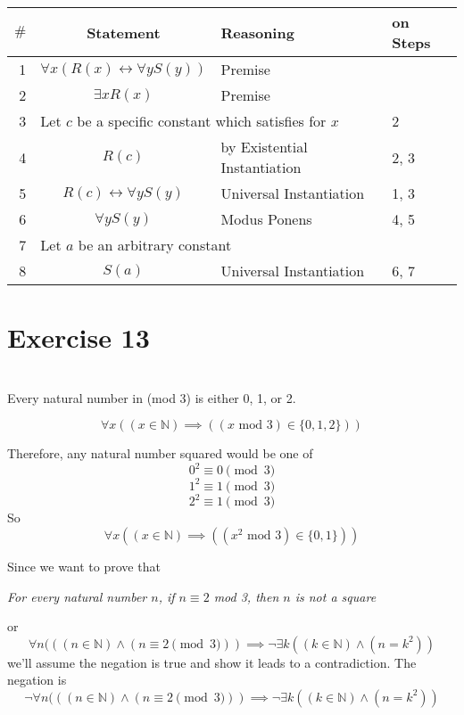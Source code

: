 \documentclass[11pt]{article}
\newcommand{\N}{\mathbb{N}}
\begin{document}
\begin{center}
    \begin{tabular}{r c l l}
        $\#$ & Statement & Reasoning & on Steps \\
        \hline
        1 & $\forall x (R(x) \leftrightarrow \forall y S(y))$ & Premise & \\
        2 & $\exists x R(x)$ & Premise & \\
        \hline
        3 & \multicolumn{2}{l}{Let $c$ be a specific constant which satisfies for $x$} & 2 \\
        4 & $R(c)$ & by Existential Instantiation & 2, 3 \\
        5 & $R(c) \leftrightarrow \forall y S(y)$ & Universal Instantiation & 1, 3 \\
        6 & $\forall y S(y)$ & Modus Ponens & 4, 5 \\
        7 & \multicolumn{3}{l}{Let $a$ be an arbitrary constant} \\
        8 & $S(a)$ & Universal Instantiation & 6, 7 \\
    \end{tabular}
\end{center}


\newpage
\section*{Exercise 13}
\\

Every natural number in (mod 3) is either 0, 1, or 2.

\[\forall x ((x\in\N) \implies ((x\text{ mod } 3) \in \{0, 1, 2\}))\]

Therefore, any natural number squared would be one of
\[0^2 \equiv 0 \pmod{3}\]
\[1^2 \equiv 1 \pmod{3}\]
\[2^2 \equiv 1 \pmod{3}\]
So
\[\forall x ((x\in\N) \implies ((x^2\text{ mod } 3) \in \{0, 1\}))\]

Since we want to prove that
\begin{center}
    \emph{For every natural number $n$, if $n \equiv 2$ mod 3, then $n$ is not a square}
\end{center}
or
\[\forall n(((n\in\N) \land (n \equiv 2 \pmod{3})) \implies \lnot\exists k((k\in\N) \land (n = k^2))\]
we'll assume the negation is true and show it leads to a contradiction. The negation is
\[\lnot\forall n(((n\in\N) \land (n \equiv 2 \pmod{3})) \implies \lnot\exists k((k\in\N) \land (n = k^2))\]
\end{document}
